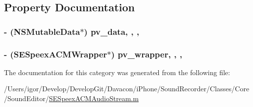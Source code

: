 \subsection{Property Documentation}
\hypertarget{category_s_e_speex_a_c_m_audio_stream_07_08_a54d58432a556297c3772d4fff8158abb}{
\subsubsection[{pv\-\_\-data}]{\setlength{\rightskip}{0pt plus 5cm}-\/ (N\-S\-Mutable\-Data$\ast$) pv\-\_\-data\hspace{0.3cm}{\ttfamily [read]}, {\ttfamily [write]}, {\ttfamily [nonatomic]}, {\ttfamily [strong]}}}\label{category_s_e_speex_a_c_m_audio_stream_07_08_a54d58432a556297c3772d4fff8158abb}
\hypertarget{category_s_e_speex_a_c_m_audio_stream_07_08_a39c90785af2560b03827ae6e280e3338}{
\subsubsection[{pv\-\_\-wrapper}]{\setlength{\rightskip}{0pt plus 5cm}-\/ (S\-E\-Speex\-A\-C\-M\-Wrapper$\ast$) pv\-\_\-wrapper\hspace{0.3cm}{\ttfamily [read]}, {\ttfamily [write]}, {\ttfamily [nonatomic]}, {\ttfamily [strong]}}}\label{category_s_e_speex_a_c_m_audio_stream_07_08_a39c90785af2560b03827ae6e280e3338}


The documentation for this category was generated from the following file\-:\begin{DoxyCompactItemize}
\item 
/\-Users/igor/\-Develop/\-Develop\-Git/\-Davacon/i\-Phone/\-Sound\-Recorder/\-Classes/\-Core/\-Sound\-Editor/\hyperlink{_s_e_speex_a_c_m_audio_stream_8m}{S\-E\-Speex\-A\-C\-M\-Audio\-Stream.\-m}\end{DoxyCompactItemize}
